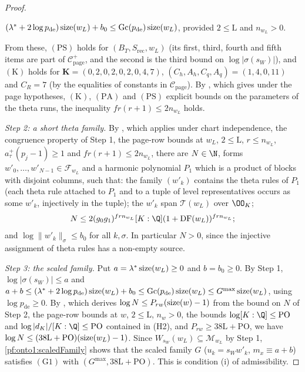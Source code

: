 \begin{proof}
\begin{itemize}
$(\lambda^*+2\log p_{\mathrm{de}})\operatorname{size}(w_L)+b_0\le\mathrm{Gc}(p_{\mathrm{de}})\operatorname{size}(w_L)$, provided $2\le\mathrm L$ and
$n_{w_L}>0$.
\end{itemize}
From these, $(\mathrm{PS})$ holds for $(B_T,S_{\mathrm{rec}},w_L)$ (its first, third, fourth and fifth items are part of
$\mathcal C^+_{\mathrm{page}}$, and the second is the third bound on $\log|\sigma(s_W)|$), and $(\mathrm K)$ holds for
$\mathbf K=(0,2,0,2,0,2,0,4,7)$, $(C_h,A_h,C_q,A_q)=(1,4,0,11)$ and $C_R=7$ (by the equalities of constants in
$\mathcal C_{\mathrm{page}}$). By , which gives under the page
hypotheses, $(\mathrm K)$, $(\mathrm{PA})$ and $(\mathrm{PS})$ explicit bounds on the parameters of the theta runs, the
inequality $fr(r+1)\le2n_{w_L}$ holds.

\emph{Step 2: a short theta family.} By ,
which applies under chart independence, the congruence property of Step 1, the page-row bounds at $w_L$, $2\le\mathrm L$,
$r\le n_{w_L}$, $a^+_\tau(p_j-1)\ge1$ and $fr(r+1)\le2n_{w_L}$, there are $N\in\N$, forms
$w'_0,\dots,w'_{N-1}\in\mathcal F_{w_L}$ and a harmonic polynomial $P_1$ which is a product of blocks with disjoint columns,
such that: the family $(w'_k)$ contains the theta rules of $P_1$ (each theta rule attached to $P_1$ and to a tuple of level
representatives occurs as some $w'_k$, injectively in the tuple); the $w'_k$ span $\mathcal T(w_L)$ over $\OO_K$;
\[
N\le2(g_0g_1)^{frn_{w_L}}[K:\Q](1+\ontooneDF(w_L))^{frn_{w_L}};
\]
and $\log\|w'_k\|_\sigma\le b_0$ for all $k,\sigma$. In particular $N>0$, since the injective assignment of theta rules
has a non-empty source.

\emph{Step 3: the scaled family.} Put $a=\lambda^*\operatorname{size}(w_L)\ge0$ and $b=b_0\ge0$. By Step 1,
$\log|\sigma(s_W)|\le a$ and $a+b\le(\lambda^*+2\log p_{\mathrm{de}})\operatorname{size}(w_L)+b_0\le\mathrm{Gc}(p_{\mathrm{de}})
\operatorname{size}(w_L)\le G^{\max}\operatorname{size}(w_L)$, using $\log p_{\mathrm{de}}\ge0$. By
, which derives $\log N\le P_{rw}(\operatorname{size}(w)-1)$ from the
bound on $N$ of Step 2, the page-row bounds at $w$, $2\le\mathrm L$, $n_w>0$, the bounds $\log[K:\Q]\le\mathrm{PO}$ and
$\log|d_K|/[K:\Q]\le\mathrm{PO}$ contained in (H2), and $P_{rw}\ge38\mathrm L+\mathrm{PO}$, we have $\log N\le(38\mathrm
L+\mathrm{PO})(\operatorname{size}(w_L)-1)$. Since $W_{s_W}(w_L)\subseteq\mathcal M_{w_L}$ by Step 1, \cref{pf:onto1:scaledFamily}
shows that the scaled family $G$ ($u_k=s_Ww'_k$, $m_x\equiv a+b$) satisfies $(\mathrm G1)$ with $(G^{\max},38\mathrm
L+\mathrm{PO})$. This is condition (i) of admissibility.


\end{proof}
